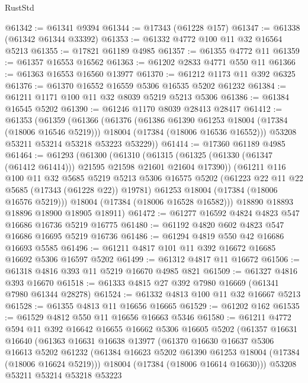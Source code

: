 \begin{lexlean}{RustStd}
\begin{coremodule}
@61342 := @61341 @9394
@61344 := @17343 (@61228 @157)
@61347 := @61338 (@61342 @61344 @33392)
@61353 := @61332 @4772 @100 @11 @32 @16564 @5213
@61355 := @17821 @61189 @4985
@61357 := @61355 @4772 @11
@61359 := @61357 @16553 @16562
@61363 := @61202 @2833 @4771 @550 @11
@61366 := @61363 @16553 @16560 @13977
@61370 := @61212 @1173 @11 @392 @6325
@61376 := @61370 @16552 @16559 @5306 @16535 @5202 @61232
@61384 := @61211 @1171 @100 @11 @32 @8039 @5219 @5213 @5306
@61386 := @61384 @16545 @5202
@61390 := @61246 @1170 @8039 @28413 @28417
@61412 := @61353
    (@61359
      (@61366
        (@61376
          (@61386 @61390 @61253 @18004 (@17384 (@18006 @16546 @5219)))
          @18004
          (@17384 (@18006 @16536 @16552)))
        @53208
        @53211
        @53214
        @53218
        @53223
        @53229))
@61414 := @17360 @61189 @4985
@61464 := @61293
    (@61300
      (@61310
        (@61315 (@61325 (@61330 (@61347 (@61412 @61414))) @21595 @21598 @21601 @21604 @17390))
        (@61211
          @116
          @100
          @11
          @32
          @5685
          @5219
          @5213
          @5306
          @16575
          @5202
          (@61223 @22 @11 @22 @5685 (@17343 (@61228 @22)) @19781)
          @61253
          @18004
          (@17384 (@18006 @16576 @5219)))
        @18004
        (@17384 (@18006 @16528 @16582)))
      @18890
      @18893
      @18896
      @18900
      @18905
      @18911)
@61472 := @61277 @16592 @4824 @4823 @547 @16686 @16736 @5219 @16775
@61480 := @61192 @4820 @602 @4823 @547 @16686 @16695 @5219 @16736
@61486 := @61294 @4819 @550 @42 @16686 @16693 @5585
@61496 := @61211 @4817 @101 @11 @392 @16672 @16685 @16692 @5306 @16597 @5202
@61499 := @61312 @4817 @11 @16672
@61506 := @61318 @4816 @393 @11 @5219 @16670 @4985 @821
@61509 := @61327 @4816 @393 @16670
@61518 := @61333 @4815 @27 @392 @7980 @16669 (@61341 @7980 @61344 @28278)
@61524 := @61332 @4813 @100 @11 @32 @16667 @5213
@61528 := @61355 @4813 @11 @16656 @16665
@61529 := @61202 @162
@61535 := @61529 @4812 @550 @11 @16656 @16663 @5346
@61580 := @61211
    @4772
    @594
    @11
    @392
    @16642
    @16655
    @16662
    @5306
    @16605
    @5202
    (@61357
      @16631
      @16640
      (@61363
        @16631
        @16638
        @13977
        (@61370
          @16630
          @16637
          @5306
          @16613
          @5202
          @61232
          (@61384 @16623 @5202 @61390 @61253 @18004 (@17384 (@18006 @16624 @5219)))
          @18004
          (@17384 (@18006 @16614 @16630)))
        @53208
        @53211
        @53214
        @53218
        @53223

\end{coremodule}
\end{lexlean}
